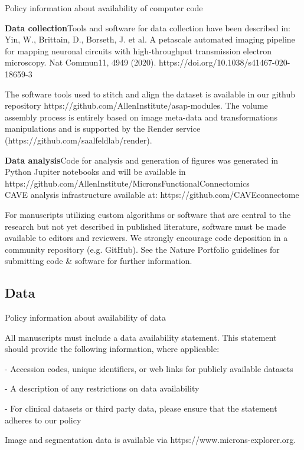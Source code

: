 \documentclass{article}
\begin{document}
Policy information about availability of computer code

\noindent\textbf{Data collection}\quad Tools and software for data collection have been described in: Yin, W., Brittain, D., Borseth, J. et al. A petascale automated imaging pipeline for mapping neuronal circuits with high-throughput transmission electron microscopy. Nat Commun11, 4949 (2020). https://doi.org/10.1038/s41467-020-18659-3

The software tools used to stitch and align the dataset is available in our github repository https://github.com/AllenInstitute/asap-modules. The volume assembly process is entirely based on image meta-data and transformations manipulations and is supported by the Render service (https://github.com/saalfeldlab/render).

\noindent\textbf{Data analysis}\quad Code for analysis and generation of figures was generated in Python Jupiter notebooks and will be available in https://github.com/AllenInstitute/MicronsFunctionalConnectomics\\
CAVE analysis infrastructure available at: https://github.com/CAVEconnectome

{\small For manuscripts utilizing custom algorithms or software that are central to the research but not yet described in published literature, software must be made available to editors and reviewers. We strongly encourage code deposition in a community repository (e.g. GitHub). See the Nature Portfolio guidelines for submitting code \& software for further information.}

\subsection*{Data}

Policy information about availability of data

All manuscripts must include a data availability statement. This statement should provide the following information, where applicable:

\begin{hangpars}
- Accession codes, unique identifiers, or web links for publicly available datasets

- A description of any restrictions on data availability

- For clinical datasets or third party data, please ensure that the statement adheres to our policy
\end{hangpars}

\noindent Image and segmentation data is available via https://www.microns-explorer.org.
\end{document}
